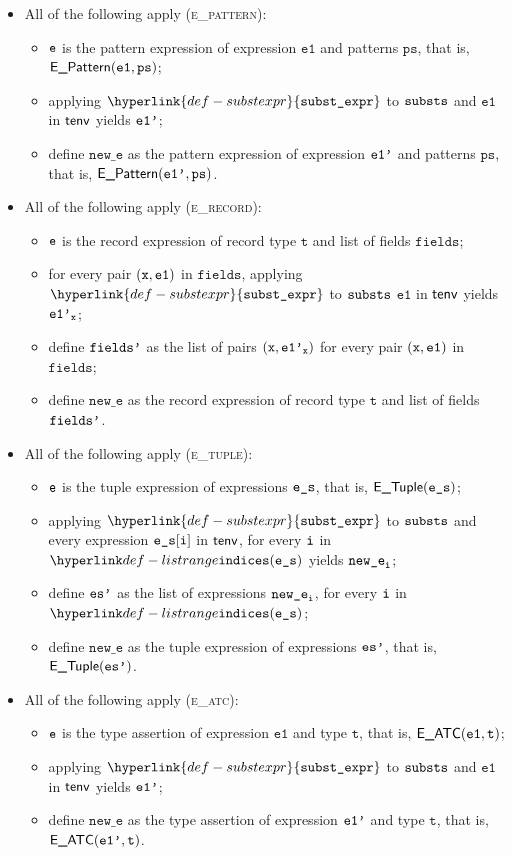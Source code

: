 \documentclass{book}
\newcommand\substexpr[0]{\hyperlink{def-substexpr}{\texttt{subst\_expr}}}
\newcommand\vt[0]{\texttt{t}}
\newcommand\veone[0]{\texttt{e1}}
\newcommand\fields[0]{\texttt{fields}}
\newcommand\newe[0]{\texttt{new\_e}}
\newcommand\vps[0]{\texttt{ps}}
\begin{document}
\begin{itemize}
  \item All of the following apply (\textsc{e\_pattern}):
  \begin{itemize}
    \item $\texttt{e}$ is the pattern expression of expression $\veone$ and patterns $\vps$, that is, \\
          $\EPattern(\veone, \vps)$;
    \item applying $\substexpr$ to $\texttt{substs}$ and $\veone$ in $\textsf{tenv}$ yields $\texttt{e1'}$;
    \item define $\newe$ as the pattern expression of expression $\texttt{e1'}$ and patterns $\vps$, that is, $\EPattern(\veonep, \vps)$.
  \end{itemize}

  \item All of the following apply (\textsc{e\_record}):
  \begin{itemize}
    \item $\texttt{e}$ is the record expression of record type $\vt$ and list of fields $\fields$;
    \item for every pair $(\vx,\veone)$ in $\fields$, applying $\substexpr$ to $\texttt{substs}$ $\veone$ in $\textsf{tenv}$ yields $\texttt{e1'}_{\texttt{x}}$;
    \item define $\texttt{fields'}$ as the list of pairs $(\texttt{x},\texttt{e1'}_{\texttt{x}})$ for every pair $(\vx,\veone)$ in $\fields$;
    \item define $\newe$ as the record expression of record type $\vt$ and list of fields $\texttt{fields'}$.
  \end{itemize}

  \item All of the following apply (\textsc{e\_tuple}):
  \begin{itemize}
    \item $\texttt{e}$ is the tuple expression of expressions $\texttt{e\_s}$, that is, $\textsf{E\_Tuple}(\texttt{e\_s})$;
    \item applying $\substexpr$ to $\texttt{substs}$ and every expression $\texttt{e\_s}[\texttt{i}]$ in $\textsf{tenv}$, for every $\texttt{i}$ in $\listrange(\ves)$
          yields $\newe_\vi$;
    \item define $\texttt{es'}$ as the list of expressions $\newe_\vi$, for every $\texttt{i}$ in $\listrange(\ves)$;
    \item define $\newe$ as the tuple expression of expressions $\texttt{es'}$, that is, $\textsf{E\_Tuple}(\texttt{es'})$.
  \end{itemize}

  \item All of the following apply (\textsc{e\_atc}):
  \begin{itemize}
    \item $\texttt{e}$ is the type assertion of expression $\veone$ and type $\vt$, that is, $\EATC(\veone, \vt)$;
    \item applying $\substexpr$ to $\texttt{substs}$ and $\veone$ in $\textsf{tenv}$ yields $\texttt{e1'}$;
    \item define $\newe$ as the type assertion of expression $\texttt{e1'}$ and type $\vt$, that is, $\EATC(\veonep, \vt)$.
  \end{itemize}


\end{itemize}
\end{document}
